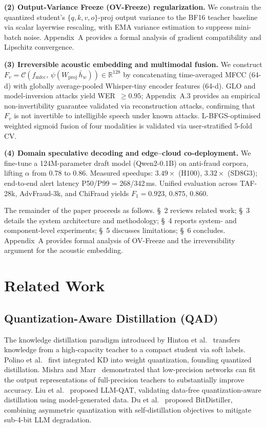\documentclass[11pt, a4paper]{article}
\begin{document}
\textbf{(2) Output-Variance Freeze (OV-Freeze) regularization.} We constrain the quantized student's $\{q,k,v,o\}$-proj output variance to the BF16 teacher baseline via scalar layerwise rescaling, with EMA variance estimation to suppress mini-batch noise. Appendix~A provides a formal analysis of gradient compatibility and Lipschitz convergence.

\textbf{(3) Irreversible acoustic embedding and multimodal fusion.} We construct $F_v = \mathcal{C}\!\left(f_{\mathrm{mfcc}},\,\psi(W_{\mathrm{proj}}\,\bar h_w)\right) \in \mathbb{R}^{128}$ by concatenating time-averaged MFCC (64-d) with globally average-pooled Whisper-tiny encoder features (64-d). GLO and model-inversion attacks yield WER~$\ge 0.95$; Appendix~A.3 provides an empirical non-invertibility guarantee validated via reconstruction attacks, confirming that $F_v$ is not invertible to intelligible speech under known attacks. L-BFGS-optimised weighted sigmoid fusion of four modalities is validated via user-stratified 5-fold CV.

\textbf{(4) Domain speculative decoding and edge--cloud co-deployment.} We fine-tune a 124M-parameter draft model (Qwen2-0.1B) on anti-fraud corpora, lifting $\alpha$ from 0.78 to 0.86. Measured speedups: $3.49\times$ (H100), $3.32\times$ (SD8G3); end-to-end alert latency P50/P99 = 268/342\,ms. Unified evaluation across TAF-28k, AdvFraud-3k, and ChiFraud yields $F_1 = 0.923$, $0.875$, $0.860$.

The remainder of the paper proceeds as follows. \S~2 reviews related work; \S~3 details the system architecture and methodology; \S~4 reports system- and component-level experiments; \S~5 discusses limitations; \S~6 concludes. Appendix~A provides formal analysis of OV-Freeze and the irreversibility argument for the acoustic embedding.

\section{Related Work}

\subsection{Quantization-Aware Distillation (QAD)}

The knowledge distillation paradigm introduced by Hinton et al.~\cite{4} transfers knowledge from a high-capacity teacher to a compact student via soft labels. Polino et al.~\cite{5} first integrated KD into weight quantization, founding quantized distillation. Mishra and Marr~\cite{6} demonstrated that low-precision networks can fit the output representations of full-precision teachers to substantially improve accuracy. Liu et al.~\cite{7} proposed LLM-QAT, validating data-free quantization-aware distillation using model-generated data. Du et al.~\cite{8} proposed BitDistiller, combining asymmetric quantization with self-distillation objectives to mitigate sub-4-bit LLM degradation.
\end{document}
